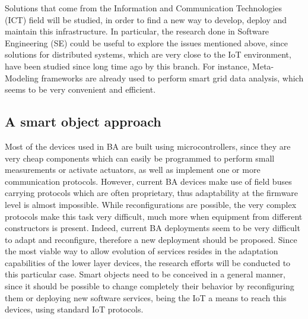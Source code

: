 Solutions that come from the Information and Communication Technologies (ICT) field will be studied, in order to find a new way to develop, deploy and maintain this infrastructure.
In particular, the research done in Software Engineering (SE) could be useful to explore the issues mentioned above, since solutions for distributed systems, which are very close to the IoT environment, have been studied since long time ago by this branch.
For instance, Meta-Modeling frameworks are already used to perform smart grid data analysis\cite{hartmann2014realisticsmartgrid}, which seems to be very convenient and efficient.

\subsection{A smart object approach}
\label{subsec:smartObjects}
Most of the devices used in BA are built using microcontrollers, since they are very cheap components which can easily be programmed to perform small measurements or activate actuators, as well as implement one or more communication protocols.
However, current BA devices make use of field buses carrying protocols which are often proprietary, thus adaptability at the firmware level is almost impossible.
While reconfigurations are possible, the very complex protocols make this task very difficult, much more when equipment from different constructors is present.
Indeed, current BA deployments seem to be very difficult to adapt and reconfigure, therefore a new deployment should be proposed.
Since the most viable way to allow evolution of services resides in the adaptation capabilities of the lower layer devices, the research efforts will be conducted to this particular case.
Smart objects need to be conceived in a general manner, since it should be possible to change completely their behavior by reconfiguring them or deploying new software services, being the IoT a means to reach this devices, using standard IoT protocols.



